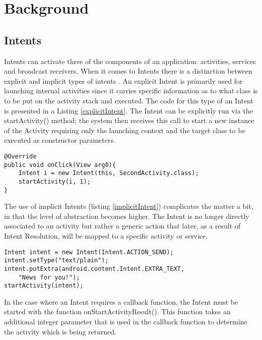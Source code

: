 \section{Background}
\label{background}

\subsection{Intents} 
\label{intents}
Intents can activate three of the components of an application: activities, services and broadcast receivers.
When it comes to Intents there is a distinction between explicit and implicit types of intents \cite{intent}.
An explicit Intent is primarily used for launching internal activities since it carries specific information as to what class is to be put on the activity stack and executed. The code for this type of an Intent is presented in a Listing \ref{explicitIntent}. The Intent can be explicitly run via the startActivity() method; the system then receives this call to start a new instance of the Activity requiring only the launching context and the target class to be executed as constructor parameters.

\footnotesize\begin{lstlisting}[label=explicitIntent,caption=Explicit Intent]
@Override
public void onClick(View arg0){
    Intent i = new Intent(this, SecondActivity.class);
    startActivity(i, 1);
}
\end{lstlisting}

The use of implicit Intents (listing \ref{implicitIntent}) complicates the matter a bit, in that the level of abstraction becomes higher. The Intent is no longer directly associated to an activity but rather a generic action that later, as a result of Intent Resolution, will be mapped to a specific activity or service.

{\footnotesize\begin{lstlisting}[label=implicitIntent,caption=Implicit Intent]
Intent intent = new Intent(Intent.ACTION_SEND);
intent.setType("text/plain");
intent.putExtra(android.content.Intent.EXTRA_TEXT, 
	"News for you!");
startActivity(intent);
\end{lstlisting}}

In the case where an Intent requires a callback function, the Intent must be started with the function onStartActivityResult(). This function takes an additional integer parameter that is used in the callback function to determine the activity which is being returned.

